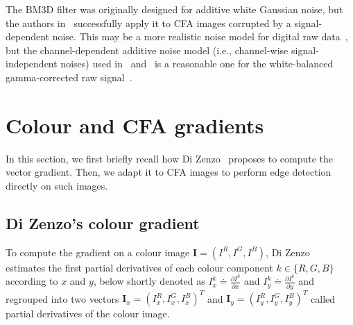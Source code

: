 \documentclass[twoside]{article}
\begin{document}
The BM3D filter was originally designed for additive white Gaussian noise, but the authors in~\cite{danielyan_lnla_2009} successfully apply it to CFA images corrupted by a signal-dependent noise. This may be a more realistic noise model for digital raw data~\cite{seybold_ism_2013}, but the channel-dependent additive noise model (i.e., channel-wise signal-independent noises) used in~\cite{zhang_ip_2009} and~\cite{akiyama_icip_2015} is a reasonable one for the white-balanced gamma-corrected raw signal~\cite{jeon_ip_2013}.



\section{Colour and CFA gradients}
\label{sec:gradients}

In this section, we first briefly recall how Di Zenzo~\cite{zenzo_cvgip_1986} proposes to compute the vector gradient. Then, we adapt it to CFA images to perform edge detection directly on such images.


\subsection{Di Zenzo's colour gradient}
\label{subsec:colour_gradient}

To compute the gradient on a colour image $\mathbf{I}=\left(I^R,I^G,I^B\right)$, Di Zenzo~\cite{zenzo_cvgip_1986} estimates the first partial derivatives of each colour component $k \in \{R,G,B\}$ according to $x$ and $y$, below shortly denoted as $I^k_x \stackrel{\cdot}{=} \frac{\partial I^k}{\partial x}$ and $I_y^k \stackrel{\cdot}{=} \frac{\partial I^k}{\partial y}$ and regrouped into two vectors $\mathbf{I}_x = \left( I^R_x, I^G_x, I^B_x \right) ^T$ and $\mathbf{I}_y = \left( I^R_y, I^G_y, I^B_y \right) ^T$ called partial derivatives of the colour image. 


\end{document}
